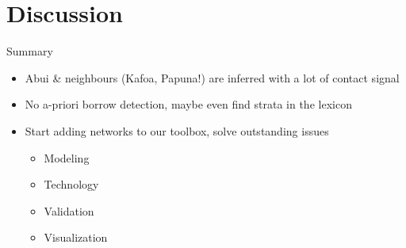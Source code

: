 \documentclass[
10pt,
]{beamer}
\begin{document}
\section{Discussion}
\begin{frame}{Summary}
  \begin{itemize}
  \item Abui \& neighbours (Kafoa, Papuna!) are inferred with a lot of contact signal
  \item No a-priori borrow detection, maybe even find strata in the lexicon
  \item Start adding networks to our toolbox, solve outstanding issues
    \begin{itemize}
    \item Modeling
    \item Technology
    \item Validation
    \item Visualization
    \end{itemize}
  \end{itemize}
\end{frame}
\end{document}
